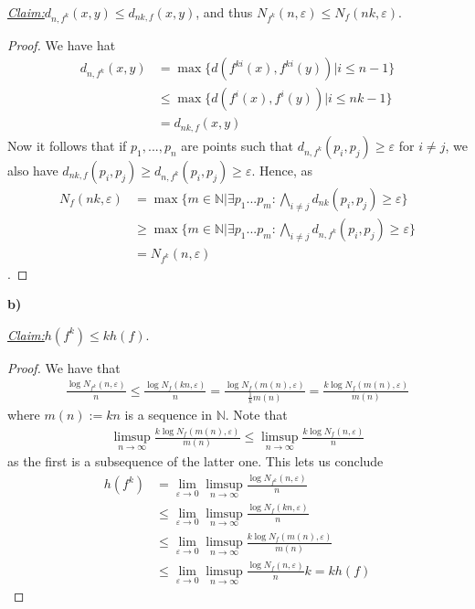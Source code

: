 \documentclass{article}
\newcommand{\N}{\mathbb{N}}
\newcommand{\claim}
{\underline{\textit{Claim:}}\hspace{0,2cm}}
\newcommand{\teilaufgabe}[1]{
{       

	\noindent\hspace*{0,1 cm}\textbf{#1)}
}
}
\theoremstyle{definition}
\theoremstyle{plain}
\theoremstyle{remark}
\begin{document}
\claim $d_{n,f^k}(x,y)\leq d_{nk,f}(x,y)$, and thus $N_{f^k}(n,\varepsilon)\leq N_f(nk,\varepsilon)$.
\begin{proof}
	We have hat 
	\begin{align}
		d_{n,f^k}(x,y) &= \max\{d\left(f^{ki}(x),f^{ki}(y)\right)|i\leq n-1\} \\
			       &\leq\max\{d\left(f^{i}(x),f^{i}(y)\right)|i\leq nk-1\} \\ 
			       &= d_{nk,f}(x,y)
	\end{align}
	Now it follows that if $p_1,...,p_n$ are points such that $d_{n,f^k}(p_i,p_j)\geq\varepsilon$ for $i\neq j$, we also have $d_{nk,f}(p_i,p_j)\geq d_{n,f^k}(p_i,p_j) \geq\varepsilon$. Hence, as 
	\begin{align}
		N_f(nk,\varepsilon)&= \max\{m\in\N| \exists p_1 ... p_m : \bigwedge_{i\neq j} d_{nk}(p_i,p_j)\geq\varepsilon\} \\
				 &\geq\max\{m\in\N| \exists p_1 ... p_m : \bigwedge_{i\neq j} d_{n,f^k}(p_i,p_j)\geq\varepsilon\}\\
				 &= N_{f^k}(n,\varepsilon)
	\end{align}.
\end{proof}
\teilaufgabe{b} \claim $h(f^k)\leq kh(f)$.
\begin{proof}
	We have that
\begin{align}
	\frac{\log N_{f^k}(n,\varepsilon)}{n} \leq \frac{\log N_f(kn,\varepsilon)}{n} = \frac{\log N_f(m(n),\varepsilon)}{\frac{1}{k}m(n)} = \frac{k\log N_f(m(n),\varepsilon)}{m(n)}
\end{align}
where $m(n):=kn$ is a sequence in $\N$. Note that 
\begin{align}
	\limsup_{n\to\infty}\frac{k\log N_f(m(n),\varepsilon)}{m(n)}\leq \limsup_{n\to\infty}\frac{k\log N_f(n,\varepsilon)}{n}
\end{align} 
as the first is a subsequence of the latter one. This lets us conclude
	\begin{align}
		h(f^k) &= \lim_{\varepsilon\to0}\limsup_{n\to\infty}\frac{\log N_{f^k}(n,\varepsilon)}{n} \\
		       &\leq\lim_{\varepsilon\to0}\limsup_{n\to\infty}\frac{\log N_f(kn,\varepsilon)}{n} \\
		       &\leq\lim_{\varepsilon\to0}\limsup_{n\to\infty}\frac{k\log N_f(m(n),\varepsilon)}{m(n)} \\
		       &\leq\lim_{\varepsilon\to0}\limsup_{n\to\infty}\frac{\log N_f(n,\varepsilon)}{n}k = kh(f)
	\end{align}
\end{proof}
\end{document}
